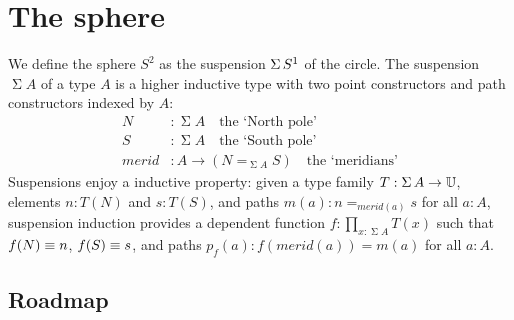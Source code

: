 \documentclass[english,a4]{article}
\def\U{\universe U}%
\begin{document}
\section{The sphere}
\newcommand{\Sp}{S^2}%
\newcommand{\mrd}{\mathit{merid}}%
\newcommand{\susp}[1]{\operatorname{\Sigma}{#1}}%
\newcommand{\Truncset}[1]{\Trunc{#1}_0}%
\newcommand{\truncset}[1]{\trunc{#1}_0}%
\newcommand{\Truncprop}[1]{\Trunc{#1}}%
\newcommand{\truncprop}[1]{\trunc{#1}}%
\newcommand{\ptdto}{\to_\ast}%
\newcommand{\flip}{\operatorname{flip}}%
\newcommand{\conncomp}[2]{{#1}_{(#2)}}%
%
We define the sphere $\Sp$ as the suspension $\susp\Sc$ of the circle.
The suspension $\susp A$ of a type $A$ is a higher inductive type 
with two point constructors and path constructors indexed by $A$:
\begin{align}
  \label{eq:suspension}
  N &: \susp A \quad\text{the `North pole'}\\
  S &: \susp A \quad\text{the `South pole'}\\
  \mrd &: A \to (N =_{\susp A} S) \quad\text{the `meridians'}
\end{align}
Suspensions enjoy a inductive property: given a type family
$T : \susp A \to \U$, elements $n:T(N)$ and $s:T(S)$, and paths
$m(a) : n=_{\mrd(a)}s$ for all $a:A$, 
suspension induction provides a dependent
function $f : \prod_{x:\susp A}T(x)$ such that $f(N) \equiv n$, $f(S) \equiv s$,
and paths $p_f(a): f(\mrd(a)) = m(a)$ for all $a:A$.

\subsection{Roadmap}
\label{sec:roadmap}
\end{document}
